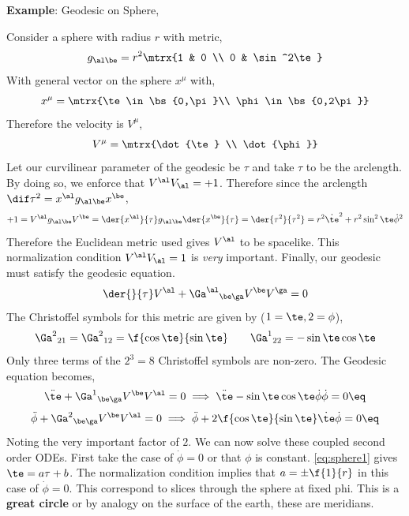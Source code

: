 \documentclass{article}
\begin{document}
\textbf{Example}: Geodesic on Sphere,
\begin{center}
\end{center}
Consider a sphere with radius $r$ with metric,
\[ g_{\al\be} = r^2 \mtrx{1 & 0 \\ 0 & \sin^2\te} \]
With general vector on the sphere $x^\mu$ with,
\[ x^\mu = \mtrx{\te \in \bs{0,\pi}\\ \phi\in \bs{0,2\pi}} \]
Therefore the velocity is $V^\mu$,
\[ V^\mu = \mtrx{\dot{\te} \\ \dot{\phi}}\]
Let our curvilinear parameter of the geodesic be $\tau$ and take $\tau$ to be the arclength. By doing so, we enforce that $V^\al V_\al = + 1$. Therefore since the arclength $\dif \tau^2 = x^\al g_{\al\be} x^\be$,
\[ +1 = V^\al g_{\al\be} V^\be = \der{x^\al}{\tau} g_{\al\be} \der{x^\be}{\tau} = \der{\tau^2}{\tau^2} = r^2\dot{\te}^2 + r^2\sin^2 \te \dot{\phi}^2 \]
Therefore the Euclidean metric used gives $V^\al$ to be spacelike.  This normalization condition $V^\al V_\al = 1$ is \textit{very} important. Finally, our geodesic must satisfy the geodesic equation.
\[ \der{}{\tau}V^\al + {\Ga^\al}_{\be\ga} V^\be V^\ga = 0 \]
The Christoffel symbols for this metric are given by ($1 = \te , 2 = \phi$),
\[ {\Ga^2}_{21} = {\Ga^2}_{12} = \f{\cos \te }{\sin \te} \qquad {\Ga^1}_{22} = - \sin \te \cos \te \]
Only three terms of the $2^3 = 8$ Christoffel symbols are non-zero. The Geodesic equation becomes,
\[ \ddot{\te} + {\Ga^{1}}_{\be\ga} V^\be V^\al = 0 \implies \ddot{\te} - \sin \te \cos \te \dot{\phi}\dot{\phi} = 0 \eq \label{eq:sphere1}\]
\[ \ddot{\phi} + {\Ga^{2}}_{\be\ga} V^\be V^\al = 0 \implies \ddot{\phi} + 2\f{\cos \te}{\sin \te}\dot{\te}\dot{\phi} = 0 \eq \label{eq:sphere2} \]
Noting the very important factor of $2$. We can now solve these coupled second order ODEs. First take the case of $\dot{\phi} = 0$ or that $\phi$ is constant. \eqref{eq:sphere1} gives $\te = a \tau + b$. The normalization condition implies that $a = \pm\f{1}{r}$ in this case of $\dot{\phi} = 0$. This correspond to slices through the sphere at fixed phi. This is a \textbf{great circle} or by analogy on the surface of the earth, these are meridians. \\
\end{document}

